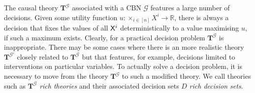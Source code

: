 The causal theory $\mathbf{T}^\mathcal{G}$ associated with a CBN $\mathcal{G}$ features a large number of decisions. Given some utility function $u:\times_{i\in [n]} X^i\to \mathbb{R}$, there is always a decision that fixes the values of all $\mathsf{X}^i$ deterministically to a value maximising $u$, if such a maximum exists. Clearly, for a practical decision problem $\mathbf{T}^\mathcal{G}$ is inappropriate. There may be some cases where there is an more realistic theory $\mathbf{T}^\mathcal{G\prime}$ closely related to $\mathbf{T}^{\mathcal{G}}$ but that features, for example, decisions limited to interventions on particular variables. To actually solve a decision problem, it is necessary to move from the theory $\mathbf{T}^\mathcal{G}$ to such a modified theory. We call theories such as $\mathbf{T}^\mathcal{G}$ \emph{rich theories} and their associated decision sets $D$ \emph{rich decision sets}.
